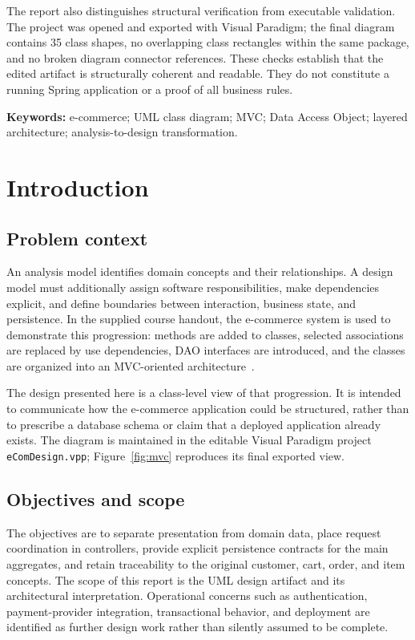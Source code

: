 \documentclass[12pt,a4paper,oneside]{report}
\begin{document}
The report also distinguishes structural verification from executable validation. The project was opened and exported with Visual Paradigm; the final diagram contains 35 class shapes, no overlapping class rectangles within the same package, and no broken diagram connector references. These checks establish that the edited artifact is structurally coherent and readable. They do not constitute a running Spring application or a proof of all business rules.

\noindent\textbf{Keywords:} e-commerce; UML class diagram; MVC; Data Access Object; layered architecture; analysis-to-design transformation.

\tableofcontents
\clearpage
{}

\chapter{Introduction}
\section{Problem context}
An analysis model identifies domain concepts and their relationships. A design model must additionally assign software responsibilities, make dependencies explicit, and define boundaries between interaction, business state, and persistence. In the supplied course handout, the e-commerce system is used to demonstrate this progression: methods are added to classes, selected associations are replaced by use dependencies, DAO interfaces are introduced, and the classes are organized into an MVC-oriented architecture~\cite{handout}.

The design presented here is a class-level view of that progression. It is intended to communicate how the e-commerce application could be structured, rather than to prescribe a database schema or claim that a deployed application already exists. The diagram is maintained in the editable Visual Paradigm project \texttt{eComDesign.vpp}; Figure~\ref{fig:mvc} reproduces its final exported view.

\section{Objectives and scope}
The objectives are to separate presentation from domain data, place request coordination in controllers, provide explicit persistence contracts for the main aggregates, and retain traceability to the original customer, cart, order, and item concepts. The scope of this report is the UML design artifact and its architectural interpretation. Operational concerns such as authentication, payment-provider integration, transactional behavior, and deployment are identified as further design work rather than silently assumed to be complete.
\end{document}
